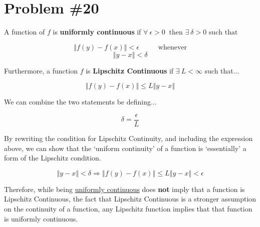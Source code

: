 \section*{Problem \#20}
A function of $f$ is \textbf{uniformly continuous} if $\forall \: \epsilon > 0 \: \text{ then } \exists \: \delta > 0 \text{ such that }$

$$ \left\Vert f(y) - f(x) \right\Vert < \epsilon \hspace{1cm} \text{ whenever} $$
$$ \left\Vert y - x \right\Vert < \delta $$

\noindent Furthermore, a function $f$ is \textbf{Lipschitz Continuous} if $\exists \: L < \infty$ such that...

$$
\left\Vert f(y) - f(x) \right\Vert \leq L \left\Vert y -x \right\Vert
$$

\noindent We can combine the two statements be defining...

$$ \delta = \frac{\epsilon}{L} $$

\noindent By rewriting the condition for Lipschitz Continuity, and including the expression above, we can show that the `uniform continuity' of a function is `essentially' a form of the Lipschitz condition.

$$ \left\Vert y - x \right\Vert < \delta \Rightarrow \left\Vert f(y) - f(x) \right\Vert \leq L \left\Vert y - x \right\Vert < \epsilon   $$


\noindent Therefore, while being \underline{uniformly continuous} does \textbf{not} imply that a function is Lipschitz Continuous, the fact that Lipschitz Continuous is a stronger assumption on the continuity of a function, any Lipschitz function implies that that function is uniformly continuous. 
